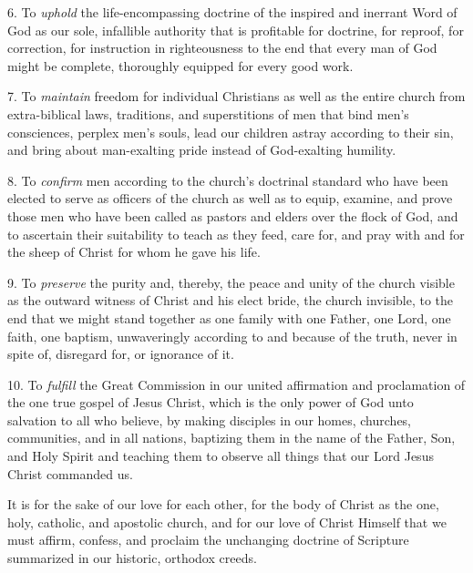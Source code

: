 \medskip

6. To \textit{uphold} the life-encompassing doctrine of the inspired and inerrant Word of God as our sole, infallible authority that is profitable for doctrine, for reproof, for correction, for instruction in righteousness to the end that every man of God might be complete, thoroughly equipped for every good work.

\medskip

7. To \textit{maintain} freedom for individual Christians as well as the entire church from extra-biblical laws, traditions, and superstitions of men that bind men’s consciences, perplex men’s souls, lead our children astray according to their sin, and bring about man-exalting pride instead of God-exalting humility.

\medskip

8. To \textit{confirm} men according to the church’s doctrinal standard who have been elected to serve as officers of the church as well as to equip, examine, and prove those men who have been called as pastors and elders over the flock of God, and to ascertain their suitability to teach as they feed, care for, and pray with and for the sheep of Christ for whom he gave his life.

\medskip

9. To \textit{preserve} the purity and, thereby, the peace and unity of the church visible as the outward witness of Christ and his elect bride, the church invisible, to the end that we might stand together as one family with one Father, one Lord, one faith, one baptism, unwaveringly according to and because of the truth, never in spite of, disregard for, or ignorance of it.

\medskip

10. To \textit{fulfill} the Great Commission in our united affirmation and proclamation of the one true gospel of Jesus Christ, which is the only power of God unto salvation to all who believe, by making disciples in our homes, churches, communities, and in all nations, baptizing them in the name of the Father, Son, and Holy Spirit and teaching them to observe all things that our Lord Jesus Christ commanded us.

\medskip

It is for the sake of our love for each other, for the body of Christ as the one, holy, catholic, and apostolic church, and for our love of Christ Himself that we must affirm, confess, and proclaim the unchanging doctrine of Scripture summarized in our historic, orthodox creeds.